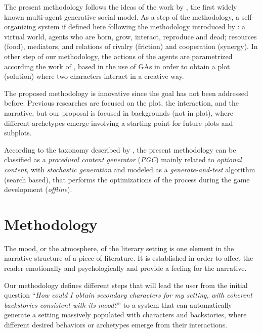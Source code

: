 \documentclass[letterpaper]{article}
\begin{document}
The present methodology follows the ideas of the work by 
\cite{epstein1996growing}, 
the first widely known multi-agent generative social model. As a step of the methodology, a self-organizing system if defined here following the methodology introduced by 
\cite{gershenson2005general}: a virtual world, agents who are born, grow, 
interact, reproduce and dead; resources (food), mediators, and
relations of rivalry (friction) and cooperation (synergy). In other step of our methodology, the actions of the agents are parametrized according the work of
\cite{nairat2011character}, based in the use of GAs in order to
obtain a plot (solution) where two characters interact in a creative way.

The proposed methodology is innovative since the goal has not been addressed before. Previous researches are focused on the plot, the interaction, and the narrative, but our proposal is focused in backgrounds (not in plot), where different archetypes emerge involving a starting point for future plots and subplots.


According to the taxonomy described by \cite{Togelius2011}, the present methodology can be classified as a \textit{procedural content generator} (\textit{PGC})
mainly related to \textit{optional content}, with \textit{stochastic generation}
and modeled as a \textit{generate-and-test} algorithm (search based), that
performs the optimizations of the process during the game development (\textit{offline}).


%
%

\section{Methodology}
\label{sec:methodology}

The mood, or the atmosphere, of the literary setting is one element in the narrative structure of a piece of literature. It is established in order to affect the reader emotionally and psychologically and provide a feeling for the narrative.


Our methodology defines different steps that will lead the user from the initial question ``\textit{How could I obtain secondary characters for my setting, with coherent backstories consistent with its mood?}'' to a system that can automatically generate a setting massively populated with characters and backstories, where different desired behaviors or archetypes emerge from their interactions.
\end{document}
